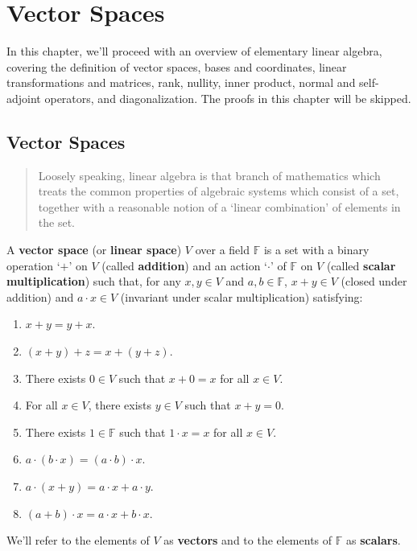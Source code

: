 \chapter{Vector Spaces}

In this chapter, we'll proceed with an overview of elementary linear algebra, covering the definition of vector spaces, bases and coordinates, linear transformations and matrices, rank, nullity, inner product, normal and self-adjoint operators, and diagonalization. The proofs in this chapter will be skipped.

\section{Vector Spaces}

\begin{quote}
	Loosely speaking, linear algebra is that branch of mathematics which treats the common properties of algebraic systems which consist of a set, together with a reasonable notion of a `linear combination' of elements in the set.
\end{quote}

\begin{definition}
	A \textbf{vector space} (or \textbf{linear space}) $V$ over a field $\mathbb{F}$ is a set with a binary operation `$+$' on $V$ (called \textbf{addition}) and an action `$\cdot$' of $\mathbb{F}$ on $V$ (called \textbf{scalar multiplication}) such that, for any $x,y \in V$ and $a, b \in \mathbb{F}$, $x+y \in V$ (closed under addition) and $a\cdot x \in V$ (invariant under scalar multiplication) satisfying:
	\begin{enumerate}
		\item $x+y = y+x$.
		\item $(x+y)+z = x + (y+z)$.
		\item There exists $0 \in V$ such that $x+ 0 = x$ for all $x \in V$.
		\item For all $x \in V$, there exists $y \in V$ such that $x+y = 0$.
		\item There exists $1 \in \mathbb{F}$ such that $1 \cdot x = x$ for all $x \in V$. 
		\item $a \cdot (b \cdot x) = (a \cdot b) \cdot x$. 
		\item $a \cdot (x + y) = a \cdot x + a \cdot y$.
		\item $(a+b)\cdot x = a \cdot x + b \cdot x$.
	\end{enumerate}
	
	We'll refer to the elements of $V$ as \textbf{vectors} and to the elements of $\mathbb{F}$ as \textbf{scalars}.
\end{definition}

